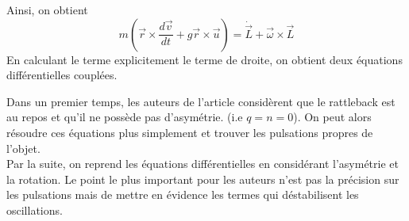 \documentclass[12pt,a4paper]{article}
\begin{document}
	Ainsi, on obtient
	\begin{equation}
	m(\vec{r}\times\dfrac{d\vec{v}}{dt}+g\vec{r}\times\vec{u})=\dot{\vec{L}}+\vec{\omega}\times\vec{L}
	\end{equation}
	En calculant le terme explicitement le terme de droite, on obtient deux équations différentielles couplées.
	
	Dans un premier temps, les auteurs de l'article considèrent que le rattleback est au repos et qu'il ne possède pas d'asymétrie. (i.e $q=n=0$). On peut alors résoudre ces équations plus simplement et trouver les pulsations propres de l'objet. \\
	
	Par la suite, on reprend les équations différentielles en considérant l'asymétrie et la rotation. Le point le plus important pour les auteurs n'est pas la précision sur les pulsations mais de mettre en évidence les termes qui déstabilisent les oscillations.  
	
	
\end{document}
